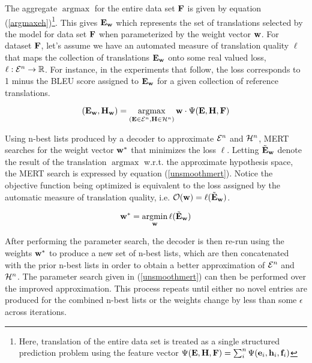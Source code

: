 \documentclass[11pt,tightenlines,kern-1pt]{article}
\DeclareMathOperator*{\argmax}{argmax}
\DeclareMathOperator*{\argmin}{argmin}
\begin{document}
The aggregate \mbox{$\argmax$} for the entire data set \mbox{${\bf F}$} is given by equation (\ref{argmaxeh})\footnote{Here, translation of the entire data set is treated as a single structured prediction problem using the feature vector  \mbox{$\Psi({\bf E}, {\bf H}, {\bf F}) = \sum_i^n \Psi({\bf e}_i, {\bf h}_i, {\bf f}_i)$}}. This gives \mbox{${\bf E}_{\bf w}$} which represents the set of translations selected by the model for data set \mbox{${\bf F}$} when parameterized by the weight vector \mbox{${\bf w}$}. For dataset \mbox{${\bf F}$}, let's assume we have an automated measure of translation quality \mbox{$\ell$} that maps the collection of translations \mbox{${\bf E}_{\bf w}$} 
onto some real valued loss, \mbox{$\ell:{\cal E}^n\rightarrow \mathbb{R}$}. For instance, in the experiments that follow, the loss corresponds to 1 minus the BLEU score assigned to \mbox{${\bf E}_{\bf w}$} for a given collection of reference translations.

\begin{equation}
({\bf E}_{\bf w}, {\bf H}_{\bf w}) = \argmax_{({\bf E} \in {\cal E}^n, {\bf H} \in {\cal H}^n)} {\bf w} \cdot \Psi({\bf E}, {\bf H}, {\bf F})
\label{argmaxeh}
\end{equation}

Using n-best lists produced by a decoder to approximate \mbox{${\cal E}^n$} and \mbox{${\cal H}^n$}, MERT searches for the weight vector \mbox{${\bf w}^*$} that minimizes the loss \mbox{$\ell$}. Letting \mbox{$\tilde{\bf E}_{\bf w}$} denote the result of the translation \mbox{$\argmax$} w.r.t\@. 
the approximate hypothesis space, 
the MERT search is expressed by equation (\ref{unsmoothmert}). Notice the objective function being optimized is equivalent to the loss assigned by the automatic measure of translation quality, i.e. \mbox{${\cal O}({\bf w}) = \ell (\tilde {\bf E}_{\bf w})$}.

\begin{equation}
{\bf w}^* = \argmin_{\bf w} \ell (\tilde {\bf E}_{\bf w}) 
\label{unsmoothmert}
\end{equation}

After performing the parameter search, the decoder is then re-run using the weights \mbox{${\bf w}^*$} to produce a new set of n-best lists, which are then concatenated with the prior n-best lists in order to obtain a better approximation of \mbox{${\cal E}^n$} and \mbox{${\cal H}^n$}. The parameter search given in (\ref{unsmoothmert}) can then be performed over the improved approximation. This process repeats until either no novel entries are produced for the combined n-best lists or the weights change by less than some \mbox{$\epsilon$} across iterations.  
\end{document}
